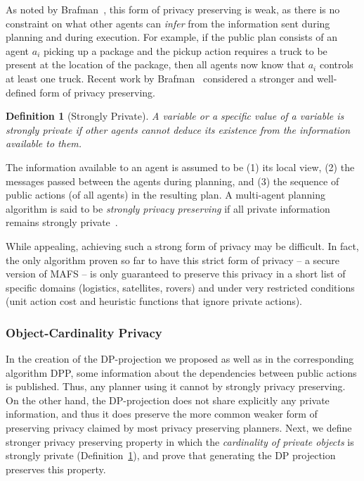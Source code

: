 \documentclass[letterpaper]{article}
\newtheorem{definition}{Definition}
\theoremstyle{definition}
\begin{document}
As noted by Brafman~, this form of privacy preserving is weak, as there is no constraint on what other agents can {\em infer} from the information sent during planning and during execution. For example, if the public plan consists of an agent $a_i$ picking up a package and the pickup action requires a truck to be present at the location of the package, then all agents now know that $a_i$ controls at least one truck. Recent work by Brafman~ considered a stronger and well-defined form of privacy preserving.
\begin{definition}[Strongly Private]
A variable or a specific value of a variable is {\em strongly private} if  other agents cannot deduce its existence from the information available to them.
\label{def:strong-private}
\end{definition}
The information available to an agent is assumed to be (1) its local view, (2) the messages passed between the agents during planning, and (3) the sequence of public actions (of all agents) in the resulting plan. A multi-agent planning algorithm is said to be {\em strongly privacy preserving} if all private information remains strongly private~\cite{Brafman15}.

While appealing, achieving such a strong form of privacy may be difficult. In fact, the only algorithm proven so far to have this strict form of privacy -- a secure version of MAFS -- is only guaranteed to preserve this privacy in a short list of specific domains (logistics, satellites, rovers) and under very restricted conditions (unit action cost and heuristic functions that ignore private actions).


\subsubsection{Object-Cardinality Privacy}
In the creation of the DP-projection we proposed as well as in the corresponding algorithm DPP, some information about the dependencies between public actions is published. Thus, any planner using it cannot by strongly privacy preserving. On the other hand, the DP-projection does not share explicitly any private information, and thus it does preserve the more common weaker form of preserving privacy claimed by most privacy preserving planners.
Next, we define stronger privacy preserving property in which the {\em cardinality of private objects} is strongly private (Definition~\ref{def:strong-private}), and prove that generating the DP projection preserves this property.
\end{document}
